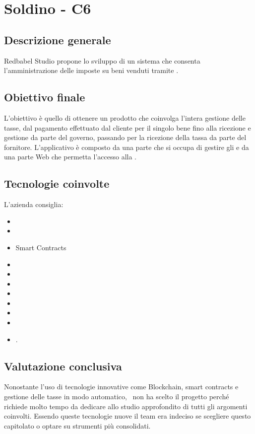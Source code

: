 \section{Soldino - C6} \label{c6}
    \subsection{Descrizione generale}
    Redbabel Studio propone lo sviluppo di un sistema che consenta l'amministrazione delle  imposte su beni venduti tramite .
    \subsection{Obiettivo finale}

    L'obiettivo è quello di ottenere un prodotto che coinvolga l'intera gestione delle tasse, dal pagamento effettuato dal cliente per il singolo bene
    fino alla ricezione e gestione da parte del governo, passando per la ricezione della tassa da parte del fornitore.
    L'applicativo è composto da una parte che si occupa di gestire gli  e da una parte Web che permetta l'accesso alla .

    \subsection{Tecnologie coinvolte}
	L'azienda consiglia:
    	\begin{itemize}
        \item {}
		\item {}
        \item Smart Contracts
		\item {}
		\item {}
		\item {}
		\item {}
        \item {}
        \item {}
        \item {}
        \item {}.
	\end{itemize}

    \subsection{Valutazione conclusiva}
    Nonostante l'uso di tecnologie innovative come Blockchain, smart contracts e gestione delle tasse in modo automatico, \gruppo\ non ha scelto
    il progetto perché richiede molto tempo da dedicare allo studio approfondito di tutti gli argomenti coinvolti.
    Essendo queste tecnologie nuove il team era indeciso se scegliere questo capitolato o optare su strumenti più consolidati.